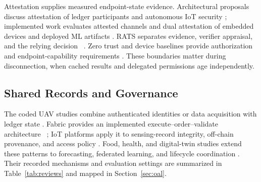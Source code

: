 \documentclass[blockchains,review,accept,moreauthors]{Definitions/mdpi}
\begin{document}
Attestation supplies measured endpoint-state evidence. Architectural proposals discuss attestation of ledger participants and autonomous IoT security \citep{hardjono2021towards,figueiredo2022arcadian}; implemented work evaluates attested channels and dual attestation of embedded devices and deployed ML artifacts \citep{ott2023universal,baciu2025secure}. RATS separates evidence, verifier appraisal, and the relying decision~ \citep{birkholz2023remote}. Zero trust and device baselines provide authorization and endpoint-capability requirements \citep{rose2020zero,syed2022zero,fagan2020iot}. These boundaries matter during disconnection, when cached results and delegated permissions age independently.

\subsection{Shared Records and Governance}

The coded UAV studies combine authenticated identities or data acquisition with ledger state \citep{han2022identity,tan2022blockchain,karmakar2024blockchain,islam2019bus}. Fabric provides an implemented execute--order--validate architecture~ \citep{androulaki2018hyperledger}; IoT platforms apply it to sensing-record integrity, off-chain provenance, and access policy \citep{hang2019design,honarpajooh2021iot,liu2020fabric}. Food, health, and digital-twin studies extend these patterns to forecasting, federated learning, and lifecycle coordination \citep{khan2020iot,rahman2020secure,suhail2022trustworthy}. Their recorded mechanisms and evaluation settings are summarized in Table~\ref{tab:reviews} and mapped in Section~\ref{sec:oal}.
\end{document}
